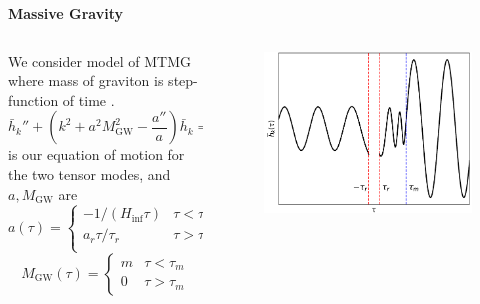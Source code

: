 \documentclass{beamer}                             %
\newcommand{\blocktitle}[1]{{\Large \textbf{#1}}}
\begin{document}
\begin{frame}[t]
\begin{columns}[T]
\begin{column}{0.30\textwidth}
  \begin{tcolorbox}
    \blocktitle{Massive Gravity}
    \vspace{0.25\baselineskip}

    \begin{columns}
      \hfill
      \begin{column}{0.5\textwidth}
    We consider model of MTMG \cite{DeFelice:2015hla} where mass of graviton is step-function of time \cite{Fujita:2018ehq}.  $$\bar{h}_k'' + \left(k^2 + a^2 M_\text{GW}^2 - \frac{a''}{a}\right)\bar{h}_k = 0 $$  
    is our equation of motion for the two tensor modes, and $a, M_{\text{GW}}$ are    
        $$a(\tau) = 
    \begin{cases}
        -1/(H_{\inf}\tau) & \tau < \tau_r \\
        a_r \tau/\tau_r & \tau > \tau_r \\
   \end{cases} $$
    $$M_\text{GW}(\tau) = 
    \begin{cases}
        m & \tau < \tau_m \\
        0 & \tau > \tau_m
   \end{cases}$$
      \end{column}
      \begin{column}{0.48\textwidth}
        \begin{figure}[t]
          \centering
          \includegraphics[width=\linewidth]{fig0-cropped.pdf} 
          \label{fig:mode}
        \end{figure}
      \end{column}
    \end{columns}
  \end{tcolorbox}
\end{column}


\end{columns}
\end{frame}
\end{document}
